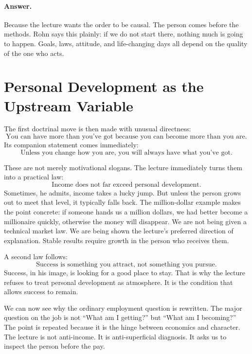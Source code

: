 \paragraph{Answer.} Because the lecture wants the order to be causal. The person comes before the methods. Rohn says this plainly: if we do not start there, nothing much is going to happen. Goals, laws, attitude, and life-changing days all depend on the quality of the one who acts.

\section{Personal Development as the Upstream Variable}

The first doctrinal move is then made with unusual directness:
\begin{equation}
\text{You can have more than you've got because you can become more than you are.}
\end{equation}
Its companion statement comes immediately:
\begin{equation}
\text{Unless you change how you are, you will always have what you've got.}
\end{equation}

These are not merely motivational slogans. The lecture immediately turns them into a practical law:
\begin{equation}
\text{Income does not far exceed personal development.}
\end{equation}
Sometimes, he admits, income takes a lucky jump. But unless the person grows out to meet that level, it typically falls back. The million-dollar example makes the point concrete: if someone hands us a million dollars, we had better become a millionaire quickly, otherwise the money will disappear. We are not being given a technical market law. We are being shown the lecture's preferred direction of explanation. Stable results require growth in the person who receives them.

A second law follows:
\begin{equation}
\text{Success is something you attract, not something you pursue.}
\end{equation}
Success, in his image, is looking for a good place to stay. That is why the lecture refuses to treat personal development as atmosphere. It is the condition that allows success to remain.

We can now see why the ordinary employment question is rewritten. The major question on the job is not ``What am I getting?'' but ``What am I becoming?'' The point is repeated because it is the hinge between economics and character. The lecture is not anti-income. It is anti-superficial diagnosis. It asks us to inspect the person before the pay.

